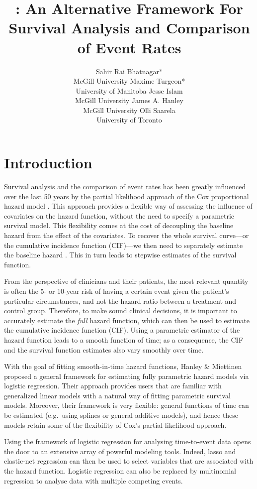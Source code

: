 \documentclass[
]{jss}
\author{
Sahir Rai Bhatnagar*\\McGill University \And Maxime Turgeon*\\University of Manitoba \AND Jesse Islam\\McGill University \And James A. Hanley\\McGill University \And Olli Saarela\\University of Toronto
}
\title{\pkg{casebase}: An Alternative Framework For Survival Analysis and
Comparison of Event Rates}
\begin{document}
\hypertarget{introduction}{%
\section{Introduction}\label{introduction}}

Survival analysis and the comparison of event rates has been greatly
influenced over the last 50 years by the partial likelihood approach of
the Cox proportional hazard model \citep{cox1972regression}. This
approach provides a flexible way of assessing the influence of
covariates on the hazard function, without the need to specify a
parametric survival model. This flexibility comes at the cost of
decoupling the baseline hazard from the effect of the covariates. To
recover the whole survival curve---or the cumulative incidence function
(CIF)---we then need to separately estimate the baseline hazard
\citep{breslow1972discussion}. This in turn leads to stepwise estimates
of the survival function.

From the perspective of clinicians and their patients, the most relevant
quantity is often the 5- or 10-year risk of having a certain event given
the patient's particular circumstances, and not the hazard ratio between
a treatment and control group. Therefore, to make sound clinical
decisions, it is important to accurately estimate the \emph{full} hazard
function, which can then be used to estimate the cumulative incidence
function (CIF). Using a parametric estimator of the hazard function
leads to a smooth function of time; as a consequence, the CIF and the
survival function estimates also vary smoothly over time.

With the goal of fitting smooth-in-time hazard functions, Hanley \&
Miettinen \citeyearpar{hanley2009fitting} proposed a general framework
for estimating fully parametric hazard models via logistic regression.
Their approach provides users that are familiar with generalized linear
models with a natural way of fitting parametric survival models.
Moreover, their framework is very flexible: general functions of time
can be estimated (e.g.~using splines or general additive models), and
hence these models retain some of the flexibility of Cox's partial
likelihood approach.

Using the framework of logistic regression for analysing time-to-event
data opens the door to an extensive array of powerful modeling tools.
Indeed, lasso and elastic-net regression can then be used to select
variables that are associated with the hazard function. Logistic
regression can also be replaced by multinomial regression to analyse
data with multiple competing events.
\end{document}
